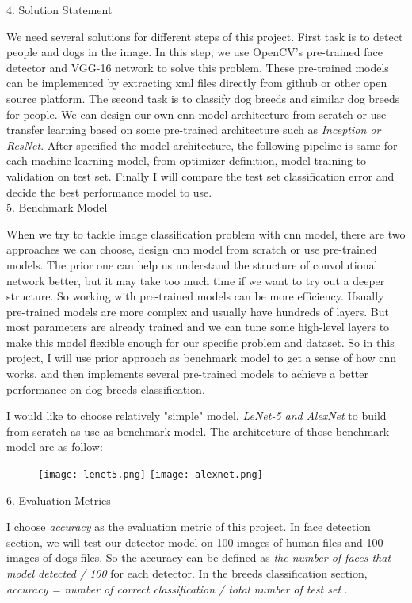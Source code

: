 \documentclass{article}
\begin{document}
4. Solution Statement

We need several solutions for different steps of this project. First task is to detect people and dogs in the image. In this step, we use OpenCV's pre-trained face detector and VGG-16 network to solve this problem. These pre-trained models can be implemented by extracting xml files directly from github or other open source platform. The second task is to classify dog breeds and similar dog breeds for people. We can design our own cnn model architecture from scratch or use transfer learning based on some pre-trained architecture such as \textit{Inception or ResNet}. After specified the model architecture, the following pipeline is same for each machine learning model, from optimizer definition, model training to validation on test set. Finally I will compare the test set classification error and decide the best performance model to use.
\\


5. Benchmark Model

When we try to tackle image classification problem with cnn model, there are two approaches we can choose, design cnn model from scratch or use pre-trained models. The prior one can help us understand the structure of convolutional network better, but it may take too much time if we want to try out a deeper structure. So working with pre-trained models can be more efficiency. Usually pre-trained models are more complex and usually have hundreds of layers. But most parameters are already trained and we can tune some high-level layers to make this model flexible enough for our specific problem and dataset. So in this project, I will use prior approach as benchmark model to get a sense of how cnn works, and then implements several pre-trained models to achieve a better performance on dog breeds classification. 

I would like to choose relatively "simple" model, \textit{LeNet-5 and AlexNet} to build from scratch as use as benchmark model. The architecture of those benchmark model are as follow\cite{cnn_architec}:
\begin{figure}[hbt!]
\texttt{[image: lenet5.png]}
\texttt{[image: alexnet.png]}
\end{figure}


6. Evaluation Metrics

I choose \textit{accuracy} as the evaluation metric of this project. In face detection section, we will test our detector model on 100 images of human files and 100 images of dogs files. So the accuracy can be defined as \textit{the number of faces that model detected / 100 } for each detector. In the breeds classification section, \textit{accuracy = number of correct classification / total number of test set} .
\\
\end{document}
